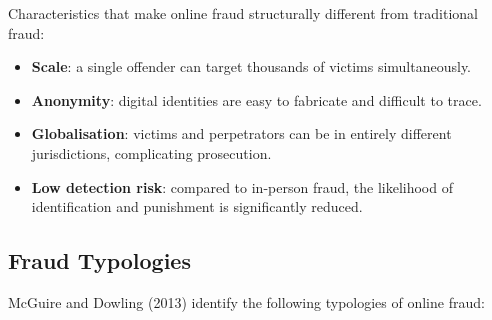 \documentclass[11pt,a4paper,openany]{report}
\theoremstyle{definition}
\theoremstyle{plain}
\theoremstyle{remark}
\begin{document}
Characteristics that make online fraud structurally different from traditional fraud:
\begin{itemize}
    \item \textbf{Scale}: a single offender can target thousands of victims simultaneously.
    \item \textbf{Anonymity}: digital identities are easy to fabricate and difficult to trace.
    \item \textbf{Globalisation}: victims and perpetrators can be in entirely different jurisdictions, complicating prosecution.
    \item \textbf{Low detection risk}: compared to in-person fraud, the likelihood of identification and punishment is significantly reduced.
\end{itemize}

\subsection{Fraud Typologies}

McGuire and Dowling (2013) identify the following typologies of online fraud:
\end{document}

